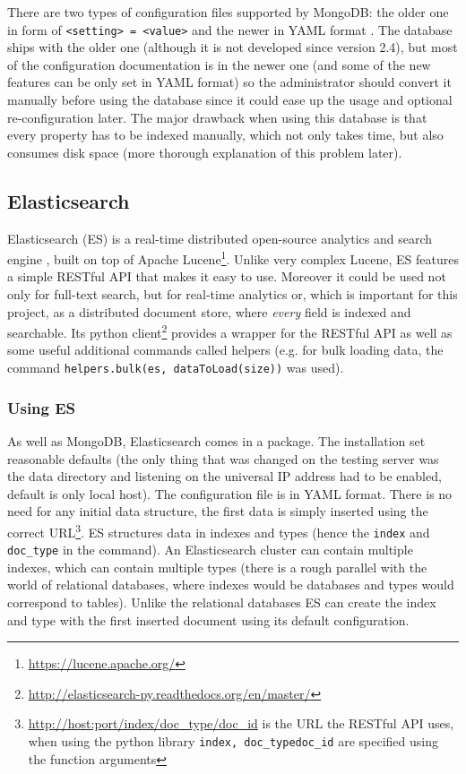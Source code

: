 There are two types
of configuration files supported by MongoDB: the older one in form of \texttt{<setting> = <value>} and the 
newer in YAML format \cite{YAML}. The database ships with the older one (although it is not developed since version 2.4), but
most of the configuration documentation is in the newer one (and some of the new features can be only set in 
YAML format) so the administrator should convert it manually before using the database since it could ease up
the usage and optional re-configuration later.
The major drawback when using this database is that every property has to be indexed manually, which not only 
takes time, but also consumes disk space (more thorough explanation of this problem later).


\subsection{Elasticsearch}

Elasticsearch (ES) is a real-time distributed open-source analytics and search engine \cite{ESBook}, 
built on top of Apache Lucene\footnote{\url{https://lucene.apache.org/}}. Unlike very complex Lucene, 
ES features a simple RESTful API that makes it easy to use. Moreover it could be used not only 
for full-text search, but for real-time analytics or, which is important for this project, as a 
distributed document store, where \textit{every} field is indexed and searchable. Its python 
client\footnote{\url{http://elasticsearch-py.readthedocs.org/en/master/}} provides a wrapper for the RESTful API
as well as some useful additional commands called helpers (e.g. for bulk loading data, the command 
\texttt{helpers.bulk(es, dataToLoad(size))} was used).

\subsubsection{Using ES}

As well as MongoDB, Elasticsearch comes in a package. The installation set reasonable 
defaults (the only thing that was changed on the testing server was the data directory and listening on the 
universal IP address had to be enabled, default is only local host). The 
configuration file is in YAML format. There is no need for any initial data structure,
the first data is simply inserted using the correct URL\footnote{\url{http://host:port/index/doc_type/doc_id}
is the URL the RESTful API uses, when using the python library \texttt{index, doc\_type}\texttt{doc\_id} are 
specified using the function arguments}. ES structures data in indexes and types (hence the \texttt{index} and
\texttt{doc\_type} in the command). An Elasticsearch cluster can contain multiple indexes, which can contain 
multiple types (there is a rough parallel with the world of relational databases, where indexes would be databases 
and types would correspond to tables). Unlike the relational databases ES can create the index and type with the 
first inserted document using its default configuration.

